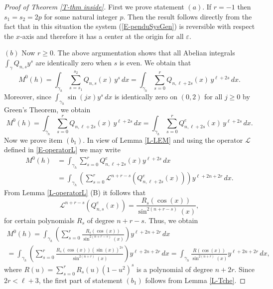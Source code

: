 \documentclass[12pt,psamsfonts]{amsart}
\begin{document}
\begin{proof}[Proof of  Theorem \ref{T-thm inside}]

First we prove statement $(a)$. If $r=-1$ then $s_1=s_2=2p$ for some
natural integer $p.$ Then the result follows directly from the fact
that in this situation the system (\ref {E-penduSysGen}) is
reversible with respect the $x$-axis and therefore it has a center
at the origin for all ${\varepsilon}.$

$(b)$ Now $r\ge 0.$ The above argumentation shows that all Abelian integrals
$\int_{\gamma}Q_{n,s}y^s$ are identically zero when $s$ is even. We obtain that
$$M^0(h)=\int_{\gamma_h}\sum_{s=s_1}^{s_2}Q_{n,s}(x)\,
y^{s}\, dx=\int_{\gamma_h}\sum_{s=0}^{r}Q_{n,\ell+2s}(x)\, y^{\ell+2s}\, dx.$$ Moreover, since
$\int_{\gamma_h}\sin(jx)y^s\, dx$ is identically zero  on $(0,2)$  for all $j\ge 0$ by Green's
Theorem, we obtain
\begin{equation*}
    M^0(h)=\int_{\gamma_h}\sum_{s=0}^{r}Q_{n,\ell+2s}(x)
        \,y^{\ell+2s}\, dx=\int_{\gamma_h}\sum_{s=0}^{r}Q^e_{n,\ell+2s}(x)
        \,y^{\ell+2s}\, dx.
\end{equation*}
Now we prove item $(b_1)$. In view of Lemma \ref{L-LEM} and using the operator ${\mathscr{L}}$ defined in
\eqref{E-operatorL} we may write
\begin{align*}
    M^0(h)&=\int_{\gamma_h}\sum_{s=0}^r Q^e_{n,\ell+2s}(x)y^{\ell+2s}\, dx\\
                &=\int_{\gamma_h}\left(\sum_{s=0}^r {\mathscr{L}}^{n+r-s}
                    \left(Q^e_{n,\ell+2s}(x)\right)\right)y^{\ell+2n+2r}\, dx.
\end{align*}
From Lemma \ref{L-operatorL} (B) it follows that
\begin{equation*}
    {\mathscr{L}}^{n+r-s}\left(Q^e_{n,s}(x)\right)=\frac{R_{s}(\cos (x))}{\sin^{2(n+r-s)}(x)},
\end{equation*}
 for  certain polynomials $R_{s}$ of degree $n+r-s.$ Thus,  we obtain
\begin{multline*}
M^0(h) = \int_{\gamma_h}\left(\sum_{s=0}^r
                    \frac{R_{s}(\cos(x))}{\sin^{2(n+r-s)}(x)}\right)y^{\ell+2n+2r}\, dx \\
           = \int_{\gamma_h}\left(\sum_{s=0}^r
                    \frac{R_{s}(\cos(x))(\sin(x))^{2s}}{\sin^{2(n+r)}(x)}\right)y^{\ell+2n+2r}\, dx
             = \int_{\gamma_h}\frac{ R(\cos(x))}{\sin^{2(n+r)}(x)}y^{\ell+2n+2r}\, dx,
 \end{multline*}
 where $R(u)=\sum_{s=0}^{r} R_{s}(u)(1-u^2)^s$ is a polynomial of
 degree $n+2r.$ Since $2r<\ell+3$, the first part of  statement  $(b_1)$ follows from
 Lemma \ref{L-Tche}.


\end{proof}
\end{document}
